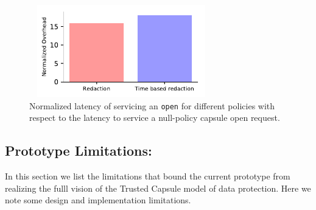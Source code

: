 \begin{figure}[t]
    \centering
    \includegraphics[width=8cm,height=4cm]{fig/policy_latencies.pdf}
    \caption{Normalized latency of servicing an \texttt{open} for different policies with respect to the latency to service a null-policy capsule open request. }
    \label{fig:policy_latency}
\end{figure}


\subsection{Prototype Limitations:}
In this section we list the limitations that bound the current prototype from
realizing the fulll vision of the Trusted Capsule model of data protection.
Here we note some design and implementation limitations.

